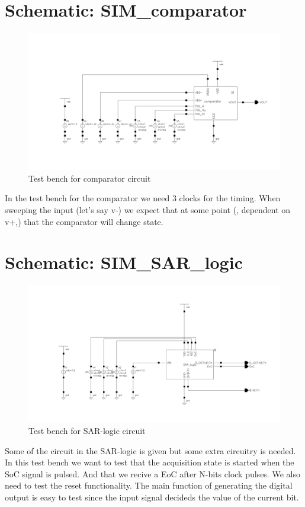 \documentclass[english, a4paper,11pt]{article}
\begin{document}
\section*{Schematic: SIM\_comparator}
\begin{figure}[!ht]
 \centering
   \includegraphics[width=\textwidth]{img/SIM_comparator.png}
   \caption{Test bench for comparator circuit}
   \label{sim:comparator}
\end{figure}
In the test bench for the comparator we need 3 clocks for the timing. 
When sweeping the input (let's say v-) we expect that at some point (, dependent on v+,) that the comparator will change state. 

\section*{Schematic: SIM\_SAR\_logic}
\begin{figure}[!ht]
 \centering
   \includegraphics[width=\textwidth]{img/SIM_SAR_logic.png}
   \caption{Test bench for SAR-logic circuit}
   \label{sim:logic}
\end{figure}
Some of the circuit in the SAR-logic is given but some extra circuitry is needed. In this test bench we want to test
that the acquisition state is started when the SoC signal is pulsed. And that we recive a EoC after N-bits clock pulses.
We also need to test the reset functionality. 
The main function of generating the digital output is easy to test since the input signal decideds the value of the current bit.
\end{document}
